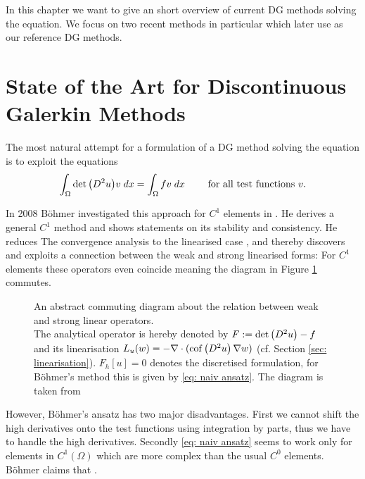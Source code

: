 In this chapter we want to give an short overview of current DG methods solving the \MA equation. We focus on two recent methods \cite{BGN+2011, Neilan2014} in particular which later use as our reference DG methods.

\section{State of the Art for Discontinuous Galerkin Methods} %

The most natural attempt for a formulation of a DG method solving the \MA equation is to exploit the equations
\begin{align}
	\int_{\Omega} {{\det{\left(D^2 u\right)} v}\;dx} = \int_{\Omega} {{fv}\;dx} \qquad \text{ for all test functions } v. \label{eq: naiv ansatz}
\end{align}

In 2008 B\"ohmer investigated this approach for $C^1$ elements in \cite{Boehmer2008}. He derives a general $C^1$ method and shows statements on its stability and consistency. 
He reduces The convergence analysis to the linearised case \cite[Section 9]{Boehmer2008}, and thereby discovers and exploits a connection between the weak and strong linearised forms: For $C^1$ elements these operators even coincide meaning the diagram in Figure \ref{fig: fe diagram} commutes.
\begin{figure}[H]
	
	\caption{An abstract commuting diagram about the relation between weak and strong linear operators.\\ The analytical \MA operator is hereby denoted by $F:=\det{\left(D^2 u\right)} -f $ and its linearisation $L_u(w) = -\nabla \cdot (\operatorname{cof} \left( D^2 u \right) \nabla w)$ (cf. Section \ref{sec: linearisation}). $F_h[u]=0$ denotes the discretised formulation, for B\"ohmer's method this is given by \eqref{eq: naiv ansatz}. The diagram is taken from \cite[Fig 2.2]{FGN2013}}
	\label{fig: fe diagram}	
\end{figure}
However, B\"ohmer's ansatz has two major disadvantages. 
First we cannot shift the high derivatives onto the test functions using integration by parts, thus we have to handle the high derivatives. Secondly \eqref{eq: naiv ansatz} seems to work only for elements in $C^1(\Omega)$ which are more complex than the usual $C^0$ elements. B\"ohmer claims that \cite[p. 1214]{Boehmer2008}.

